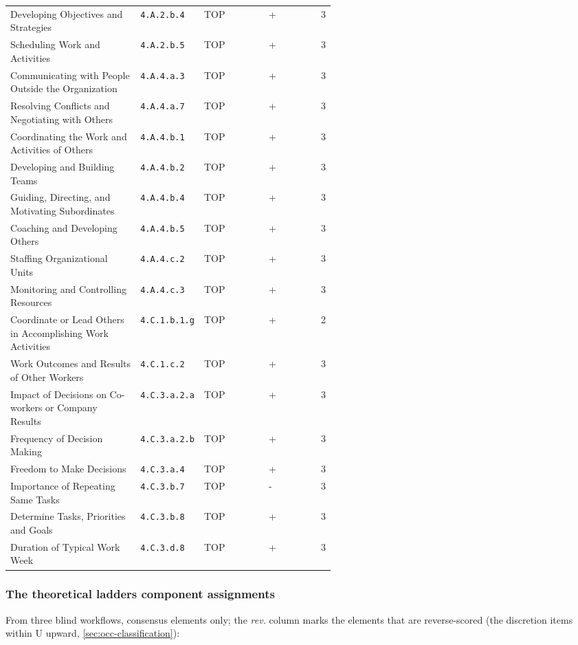 \begin{longtable}[]{@{}p{0.40\linewidth}p{0.15\linewidth}llr@{}}
Developing Objectives and Strategies & \texttt{4.A.2.b.4} & TOP & + & 3 \\
Scheduling Work and Activities & \texttt{4.A.2.b.5} & TOP & + & 3 \\
Communicating with People Outside the Organization & \texttt{4.A.4.a.3} & TOP & + & 3 \\
Resolving Conflicts and Negotiating with Others & \texttt{4.A.4.a.7} & TOP & + & 3 \\
Coordinating the Work and Activities of Others & \texttt{4.A.4.b.1} & TOP & + & 3 \\
Developing and Building Teams & \texttt{4.A.4.b.2} & TOP & + & 3 \\
Guiding, Directing, and Motivating Subordinates & \texttt{4.A.4.b.4} & TOP & + & 3 \\
Coaching and Developing Others & \texttt{4.A.4.b.5} & TOP & + & 3 \\
Staffing Organizational Units & \texttt{4.A.4.c.2} & TOP & + & 3 \\
Monitoring and Controlling Resources & \texttt{4.A.4.c.3} & TOP & + & 3 \\
Coordinate or Lead Others in Accomplishing Work Activities & \texttt{4.C.1.b.1.g} & TOP & + & 2 \\
Work Outcomes and Results of Other Workers & \texttt{4.C.1.c.2} & TOP & + & 3 \\
Impact of Decisions on Co-workers or Company Results & \texttt{4.C.3.a.2.a} & TOP & + & 3 \\
Frequency of Decision Making & \texttt{4.C.3.a.2.b} & TOP & + & 3 \\
Freedom to Make Decisions & \texttt{4.C.3.a.4} & TOP & + & 3 \\
Importance of Repeating Same Tasks & \texttt{4.C.3.b.7} & TOP & - & 3 \\
Determine Tasks, Priorities and Goals & \texttt{4.C.3.b.8} & TOP & + & 3 \\
Duration of Typical Work Week & \texttt{4.C.3.d.8} & TOP & + & 3 \\
\end{longtable}
\endgroup

\subsubsection{The theoretical ladder\textquotesingle s component assignments}\label{sub:theoretical-components}

From three blind workflows, consensus elements only; the \emph{rev.} column marks
the elements that are reverse-scored (the discretion items within U upward,
\cref{sec:occ-classification}):

